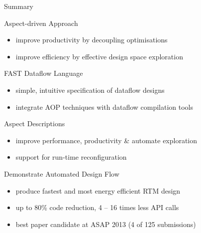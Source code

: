 \begin{frame}{Summary}

  \begin{beamerboxesrounded}{Aspect-driven Approach}
    \begin{itemize}
    \item improve productivity by decoupling optimisations
    \item improve efficiency by effective design space exploration
    \end{itemize}
  \end{beamerboxesrounded}

  \begin{beamerboxesrounded}{FAST Dataflow Language}
    \begin{itemize}
    \item simple, intuitive specification of dataflow designs
    \item integrate AOP techniques with dataflow compilation tools
    \end{itemize}
  \end{beamerboxesrounded}

  \begin{beamerboxesrounded}{Aspect Descriptions}
    \begin{itemize}
      \item improve performance, productivity \& automate exploration
      \item support for run-time reconfiguration
    \end{itemize}
  \end{beamerboxesrounded}

  \begin{beamerboxesrounded}{Demonstrate Automated Design Flow}
    \begin{itemize}
    \item produce fastest and most energy efficient RTM design
    \item up to 80\% code reduction, 4 -- 16 times less API calls
    \item best paper candidate at ASAP 2013 (4 of 125 submissions)
    \end{itemize}
  \end{beamerboxesrounded}

\end{frame}
